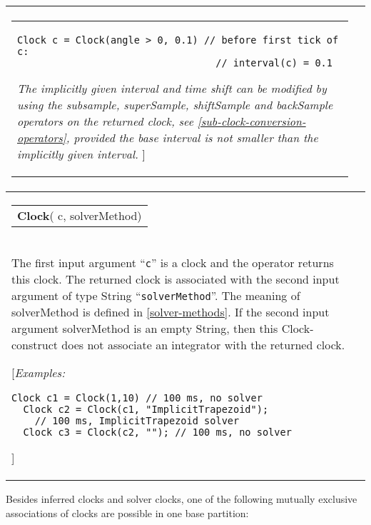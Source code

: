 \begin{longtable}[]{|p{3cm}|p{12cm}|}
\begin{tabular}{@{}p{119mm}@{}}
\begin{lstlisting}[language=modelica]
  Clock c = Clock(angle > 0, 0.1) // before first tick of c:
                                  // interval(c) = 0.1
\end{lstlisting}

\emph{The implicitly given interval and time shift can be modified by
using the subsample, superSample, shiftSample and backSample operators
on the returned clock, see \autoref{sub-clock-conversion-operators}, provided the base
interval is not smaller than the implicitly given interval.} {]}
\end{tabular}\\ \hline
\begin{tabular}{@{}p{29mm}@{}}
\textbf{Clock}(\newline
 c,\newline
 solverMethod)\newline
\end{tabular}
&
\begin{tabular}{@{}p{119mm}@{}}
\textbf{Solver Clock}\\

The first input argument ``\lstinline!c!'' is a clock and the operator returns this
clock. The returned clock is associated with the second input argument
of type String ``\lstinline!solverMethod!''. The meaning of solverMethod is defined
in \autoref{solver-methods}. If the second input argument solverMethod is an empty
String, then this Clock-construct does not associate an integrator with the returned clock.

{[}\emph{Examples:}
\begin{lstlisting}[language=modelica]
  Clock c1 = Clock(1,10) // 100 ms, no solver
  Clock c2 = Clock(c1, "ImplicitTrapezoid"); 
    // 100 ms, ImplicitTrapezoid solver 
  Clock c3 = Clock(c2, ""); // 100 ms, no solver
\end{lstlisting}
{]}\strut
\end{tabular}
\\ \hline

\end{longtable}

Besides inferred clocks and solver clocks, one of the following mutually
exclusive associations of clocks are possible in one base partition:

